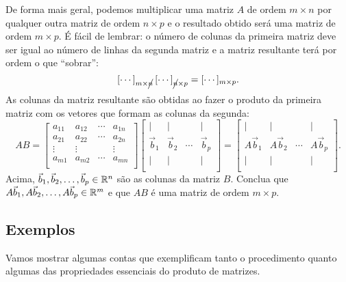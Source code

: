 \documentclass[../livro.tex]{subfiles}  %
\begin{document}
De forma mais geral, podemos multiplicar uma matriz $A$ de ordem $m \times n$ por qualquer outra matriz de ordem $n \times p$ e o resultado obtido será uma matriz de ordem $m \times p$. É fácil de lembrar: o número de colunas da primeira matriz deve ser igual ao número de linhas da segunda matriz e a matriz resultante terá por ordem o que  ``sobrar'':
\[
[\cdots]_{m \times \cancel{n}} \, [\cdots]_{\cancel{n} \times p} = [\cdots]_{m \times p}.
\] As colunas da matriz resultante são obtidas ao fazer o produto da primeira matriz com os vetores que formam as colunas da segunda:
\[
A B =
\left[
\begin{array}{cccc}
a_{11} & a_{12} & \cdots & a_{1n} \\
a_{21} & a_{22} & \cdots & a_{2n} \\
\vdots & \vdots &        & \vdots \\
a_{m1} & a_{m2} & \cdots & a_{mn} \\
\end{array}
\right]
\left[
\begin{array}{cccc}
| & |  &   & | \\
\vec{b}_{1} & \vec{b}_{2} & \cdots & \vec{b}_{p} \\
| & |  &   & | \\
\end{array}
\right] =
\left[
\begin{array}{cccc}
| & |  &   & | \\
A\vec{b}_{1} & A\vec{b}_{2} & \cdots & A\vec{b}_{p} \\
| & |  &   & | \\
\end{array}
\right].
\] Acima, $\vec{b}_{1}, \vec{b}_{2}, \dots, \vec{b}_{p} \in \mathbb{R}^n$ são as colunas da matriz $B$. Conclua que $A\vec{b}_{1}, A\vec{b}_{2}, \dots, A\vec{b}_{p} \in \mathbb{R}^m$ e que $AB$ é uma matriz de ordem $m \times p$.

\subsection{Exemplos}

Vamos mostrar algumas contas que exemplificam tanto o procedimento quanto algumas das propriedades essenciais do produto de matrizes.
\end{document}

